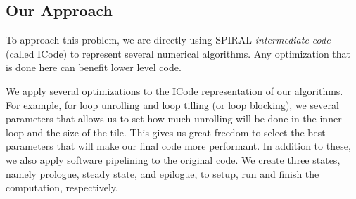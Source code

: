 \documentclass[10pt]{article}
\begin{document}
\begin{comment}
+( ) APGS aim to replace expert programmers for high-performance code.
+( ) For some classes of operations they have been very successful, but for
  others they fall short in performance.

+( ) Most expert programmers code their implementations in low-level assembly
  code and perform micro-architectural specific optimizations that production
  compilers cannot do for loss of generality.

+( ) This is further aggravated by the fact that experts test and tune various
  permutations of their code and its scheduling, a task that compilers do not
  do for the same reasoning as above.

+( ) Even on out-of-order machines scheduling at the code level is important
     to minimize the effects of long dependency chains that can cause the
     system to behave like an in-order processor.


+( ) APGS tune and optimize an implementation of an operations from the
  algorithmic level down to the low level just as an expert would, but because
  these systems rely on a high-level language like C as a target instead of
  assembly.

+( ) As a result these systems must rely on the compiler for instruction
  scheduling.

+( ) One could target assembly instead of a higher-level language but that
  defeats the purpose of having a portable system that can generate
  specialized code

+( ) How can we effectively schedule code at the high-level and generate
  high-performance code that is comparable to an expert.
\end{comment}

\subsection{Our Approach}

To approach this problem, we are directly using SPIRAL \emph{intermediate code} (called ICode)
to represent several numerical algorithms. Any optimization that is done here can benefit
lower level code.

We apply several optimizations to the ICode representation of our algorithms. For example,
for loop unrolling and loop tilling (or loop blocking), we several parameters that allows
us to set how much unrolling will be done in the inner loop and the size of the tile.
This gives us great freedom to select the best parameters that will make our final code more
performant. In addition to these, we also apply software pipelining to the original code.
We create three states, namely prologue, steady state, and epilogue, to setup, run and finish
the computation, respectively.
\end{document}
